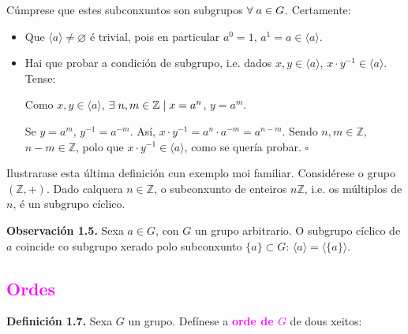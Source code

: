 \documentclass[twoside]{report}
\theoremstyle{mystyle}
\begin{document}
\noindent Cúmprese que estes subconxuntos son subgrupos $\forall \hspace{1mm} a \in G$. Certamente:

\begin{itemize}
    \item Que $\langle a \rangle \neq \varnothing$ é trivial, pois en particular $a^{0} = 1$, $a^{1} = a \in \langle a \rangle$.  
    \item Hai que probar a condición de subgrupo, i.e. dados $x,y \in \langle a \rangle$, $x \cdot y^{-1} \in \langle a \rangle$. Tense: 
    
    \vspace{1mm}
    
    Como $x,y \in \langle a \rangle$, $\exists \hspace{1mm} n,m \in \mathbb{Z} \hspace{1mm} | \hspace{1mm} x = a^{n}$, $y = a^{m}$.
    
    Se $y = a^{m}$, $y^{-1} = a^{-m}$. Así, $x \cdot y^{-1} = a^{n} \cdot a^{-m} = a^{n-m}$. Sendo $n,m \in \mathbb{Z}$, $n-m \in \mathbb{Z}$, polo que $x \cdot y^{-1} \in \langle a \rangle$, como se quería probar. $\square$
    
\end{itemize}

\vspace{3mm}

\noindent Ilustrarase esta última definición cun exemplo moi familiar. Considérese o grupo $(\mathbb{Z}, +)$. Dado calquera $n \in \mathbb{Z}$, o subconxunto de enteiros $n\mathbb{Z}$, i.e. os múltiplos de $n$, é un subgrupo cíclico. 

\vspace{3mm}

\noindent \textbf{Observación 1.5.} Sexa $a \in G$, con $G$ un grupo arbitrario. O subgrupo cíclico de $a$ coincide co subgrupo xerado polo subconxunto $\{a\} \subset G$: $\langle a \rangle = \langle \{a\} \rangle$.

\textcolor{magenta}{\subsection{Ordes}}

\vspace{3mm}

\noindent \textbf{Definición 1.7.} Sexa $G$ un grupo. Defínese a \textcolor{magenta}{\textbf{orde de $G$}} de dous xeitos:
\end{document}

